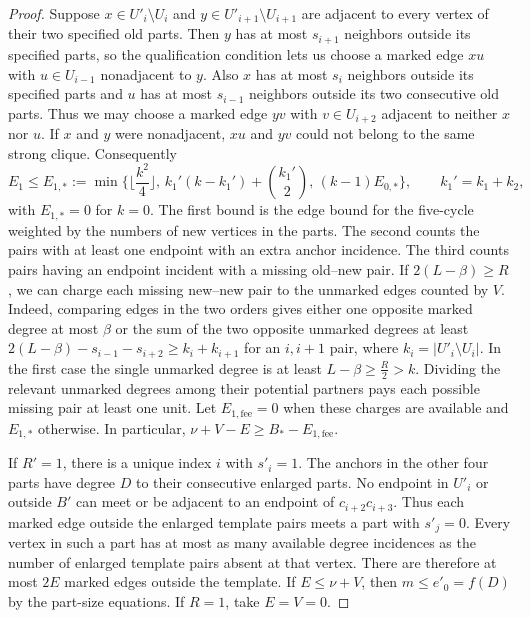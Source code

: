 \begin{proof}
Suppose $x\in U'_i\setminus U_i$ and $y\in U'_{i+1}\setminus U_{i+1}$
are adjacent to every vertex of their two specified old parts.
Then $y$ has at most $s_{i+1}$ neighbors outside its specified parts,
so the qualification condition lets us choose a marked edge $xu$
with $u\in U_{i-1}$ nonadjacent to $y$. Also $x$ has at most $s_i$
neighbors outside its specified parts and $u$ has at most $s_{i-1}$
neighbors outside its two consecutive old parts. Thus we may choose a
marked edge $yv$ with $v\in U_{i+2}$ adjacent to neither $x$ nor $u$.
If $x$ and $y$ were nonadjacent, $xu$ and $yv$ could not belong to
the same strong clique. Consequently
\[
 E_1\leq E_{1,*}:=\min\{\lfloor \frac{k^2}{4}\rfloor,\,
 k_1' (k-k_1')+\binom{k_1'}{2},\,(k-1)E_{0,*}\},
 \qquad k_1'=k_1+k_2 ,
\]
with $E_{1,*}=0$ for $k=0$. The first bound is the edge bound for the
five-cycle weighted by the numbers of new vertices in the parts.
The second counts the pairs with at least one endpoint with an extra
anchor incidence. The third counts pairs having an endpoint incident
with a missing old--new pair. If $2(L-\beta)\geq R$, we can charge
each missing new--new pair to the unmarked edges counted by $V$.
Indeed, comparing edges in
the two orders gives either one opposite marked degree at most $\beta$ or
the sum of the two opposite unmarked degrees at least
$2(L-\beta)-s_{i-1}-s_{i+2}\geq k_i+k_{i+1}$ for an $i,i+1$ pair,
where $k_i=|U'_i\setminus U_i|$. In the first case the single unmarked
degree is at least $L-\beta\geq \frac{R}{2}>k$. Dividing the relevant unmarked
degrees among their potential partners pays each possible missing
pair at least one unit. Let $E_{1,\mathrm{fee}}=0$ when these charges
are available and $E_{1,*}$ otherwise. In particular,
$\nu+V-E\geq B_*-E_{1,\mathrm{fee}}$.

If $R'=1$, there is a unique index $i$ with $s'_i=1$. The anchors
in the other four parts have degree $D$ to their consecutive enlarged
parts. No endpoint in $U'_i$ or outside $B'$ can meet or be adjacent
to an endpoint of $c_{i+2}c_{i+3}$. Thus each marked edge outside the
enlarged template pairs meets a part with $s'_j=0$. Every vertex in
such a part has at most as many available degree incidences as the
number of enlarged template pairs absent at that vertex. There are
therefore at most $2E$ marked edges outside the template.
If $E\leq \nu+V$, then $m\leq e'_0=f(D)$ by the part-size equations.
If $R=1$, take $E=V=0$.


\end{proof}
